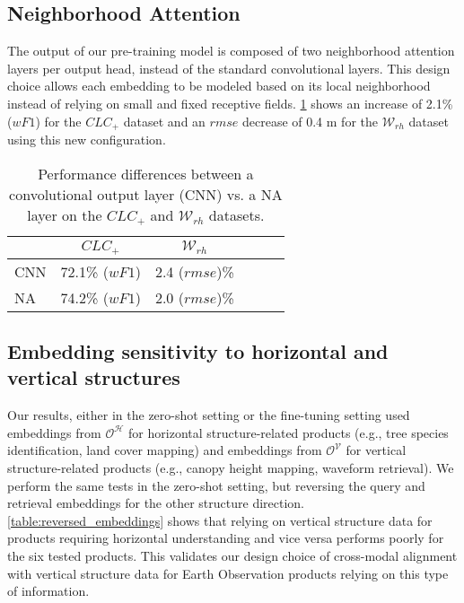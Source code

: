 \subsection{Neighborhood Attention}
The output of our pre-training model is composed of two neighborhood attention layers per output head, instead of the standard convolutional layers. This design choice allows each embedding to be modeled based on its local neighborhood instead of relying on small and fixed receptive fields. \cref{table:na_perf} shows an increase of 2.1\% ($wF1$) for the $CLC_+$ dataset and an $rmse$ decrease of 0.4 m for the $\mathcal{W}_{rh}$ dataset using this new configuration.       

\begin{table}[h]
\caption{Performance differences between a convolutional output layer (CNN) vs. a NA layer on the $CLC_+$ and $\mathcal{W}_{rh}$ datasets.}
\label{table:na_perf}
\centering
\begin{tabular}{lccccc}
\toprule
 & $CLC_+$ & $\mathcal{W}_{rh}$\\
\midrule
CNN   & 72.1\% ($wF1$) & 2.4 ($rmse$)\%\\
NA   & 74.2\% ($wF1$) & 2.0 ($rmse$)\%\\
\bottomrule
\end{tabular}
\end{table}

\subsection{Embedding sensitivity to horizontal and vertical structures}
Our results, either in the zero-shot setting or the fine-tuning setting used embeddings from $\mathcal{O}^{\mathcal{H}}$ for horizontal structure-related products (e.g., tree species identification, land cover mapping) and embeddings from $\mathcal{O}^{\mathcal{V}}$ for vertical structure-related products (e.g., canopy height mapping, waveform retrieval). We perform the same tests in the zero-shot setting, but reversing the query and retrieval embeddings for the other structure direction. \cref{table:reversed_embeddings} shows that relying on vertical structure data for products requiring horizontal understanding and vice versa performs poorly for the six tested products. This validates our design choice of cross-modal alignment with vertical structure data for Earth Observation products relying on this type of information.

